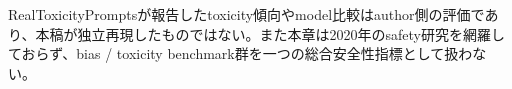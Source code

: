\begin{claimboundary}
RealToxicityPromptsが報告したtoxicity傾向やmodel比較はauthor側の評価であり、本稿が独立再現したものではない。また本章は2020年のsafety研究を網羅しておらず、bias / toxicity benchmark群を一つの総合安全性指標として扱わない。\autocite{src-308178e74f55}
\end{claimboundary}

